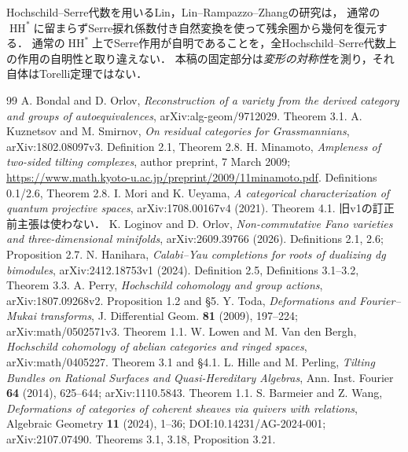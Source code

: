 \documentclass[11pt,a4paper]{ltjsarticle}
\newcommand{\HH}{\operatorname{HH}}
\begin{document}
Hochschild--Serre代数を用いるLin\cite{Lin}，Lin--Rampazzo--Zhang\cite{LRZ}の研究は，
通常の$\HH^*$に留まらずSerre捩れ係数付き自然変換を使って残余圏から幾何を復元する．
通常の$\HH^*$上でSerre作用が自明であることを，全Hochschild--Serre代数上の作用の自明性と取り違えない．
本稿の固定部分は\emph{変形の対称性}を測り，それ自体はTorelli定理ではない．









\begingroup\small
\begin{thebibliography}{99}
 A. Bondal and D. Orlov, \emph{Reconstruction of a variety from the derived category and groups of autoequivalences}, arXiv:alg-geom/9712029. Theorem 3.1.
 A. Kuznetsov and M. Smirnov, \emph{On residual categories for Grassmannians}, arXiv:1802.08097v3. Definition 2.1, Theorem 2.8.
 H. Minamoto, \emph{Ampleness of two-sided tilting complexes}, author preprint, 7 March 2009; \url{https://www.math.kyoto-u.ac.jp/preprint/2009/11minamoto.pdf}. Definitions 0.1/2.6, Theorem 2.8.
 I. Mori and K. Ueyama, \emph{A categorical characterization of quantum projective spaces}, arXiv:1708.00167v4 (2021). Theorem 4.1. 旧v1の訂正前主張は使わない．
 K. Loginov and D. Orlov, \emph{Non-commutative Fano varieties and three-dimensional minifolds}, arXiv:2609.39766 (2026). Definitions 2.1, 2.6; Proposition 2.7.
 N. Hanihara, \emph{Calabi--Yau completions for roots of dualizing dg bimodules}, arXiv:2412.18753v1 (2024). Definition 2.5, Definitions 3.1--3.2, Theorem 3.3.
 A. Perry, \emph{Hochschild cohomology and group actions}, arXiv:1807.09268v2. Proposition 1.2 and \S5.
 Y. Toda, \emph{Deformations and Fourier--Mukai transforms}, J. Differential Geom. \textbf{81} (2009), 197--224; arXiv:math/0502571v3. Theorem 1.1.
 W. Lowen and M. Van den Bergh, \emph{Hochschild cohomology of abelian categories and ringed spaces}, arXiv:math/0405227. Theorem 3.1 and \S4.1.
 L. Hille and M. Perling, \emph{Tilting Bundles on Rational Surfaces and Quasi-Hereditary Algebras}, Ann. Inst. Fourier \textbf{64} (2014), 625--644; arXiv:1110.5843. Theorem 1.1.
 S. Barmeier and Z. Wang, \emph{Deformations of categories of coherent sheaves via quivers with relations}, Algebraic Geometry \textbf{11} (2024), 1--36; DOI:10.14231/AG-2024-001; arXiv:2107.07490. Theorems 3.1, 3.18, Proposition 3.21.

\end{thebibliography}
\end{document}
